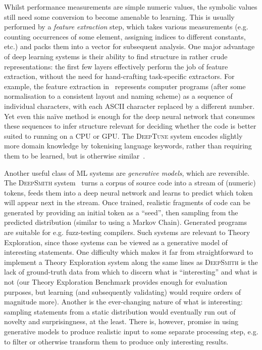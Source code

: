 Whilst performance measurements are simple numeric values, the symbolic values
still need some conversion to become amenable to learning. This is usually
performed by a \emph{feature extraction} step, which takes various measurements
(e.g.  counting occurrences of some element, assigning indices to different
constants, etc.) and packs them into a vector for subsequent analysis. One major
advantage of deep learning systems is their ability to find structure in rather
crude representations: the first few layers effectively perform the job of
feature extraction, without the need for hand-crafting task-specific extractors.
For example, the feature extraction in~\cite{cummins2017synthesizing} represents
computer programs (after some normalisation to a consistent layout and naming
scheme) as a sequence of individual characters, with each ASCII character
replaced by a different number. Yet even this na\"ive method is enough for the
deep neural network that consumes these sequences to infer structure relevant
for deciding whether the code is better suited to running on a CPU or GPU. The
\textsc{DeepTune} system encodes slightly more domain knowledge by tokenising
language keywords, rather than requiring them to be learned, but is otherwise
similar~\cite{cummins2017end}.

Another useful class of ML systems are \emph{generative models}, which are
reversible. The \textsc{DeepSmith} system~\cite{cummins2017deepsmith} turns a
corpus of source code into a stream of (numeric) tokens, feeds them into a deep
neural network and learns to predict which token will appear next in the stream.
Once trained, realistic fragments of code can be generated by providing an
initial token as a ``seed'', then sampling from the predicted distribution
(similar to using a Markov Chain). Generated programs are suitable for e.g.
fuzz-testing compilers. Such systems are relevant to Theory Exploration, since
those systems can be viewed as a generative model of interesting statements. One
difficulty which makes it far from straightforward to implement a Theory
Exploration system along the same lines as \textsc{DeepSmith} is the lack of
ground-truth data from which to discern what is ``interesting'' and what is not
(our Theory Exploration Benchmark %
provides enough for evaluation purposes, but learning (and subsequently
validating) would require orders of magnitude more). Another is the
ever-changing nature of what is interesting: sampling statements from a static
distribution would eventually run out of novelty and surprisingness, at the
least. There is, however, promise in using generative models to produce
realistic input to some separate processing step, e.g. to filter or otherwise
transform them to produce only interesting results.
